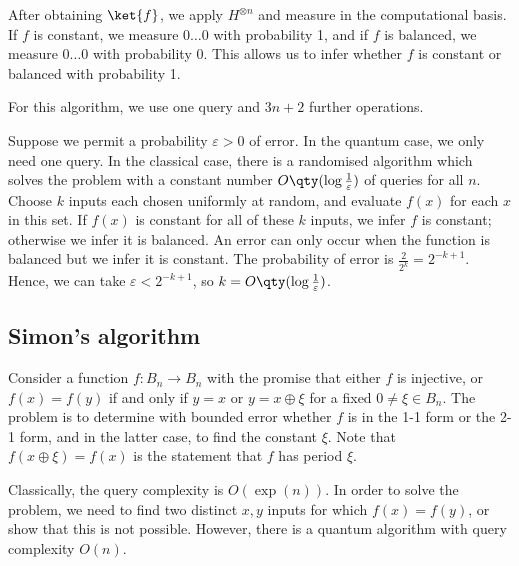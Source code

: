After obtaining $\ket{f}$, we apply $H^{\otimes n}$ and measure in the computational basis.
If $f$ is constant, we measure $0\dots 0$ with probability 1, and if $f$ is balanced, we measure $0\dots 0$ with probability 0.
This allows us to infer whether $f$ is constant or balanced with probability 1.
\begin{center}
    \leavevmode
\end{center}
For this algorithm, we use one query and $3n+2$ further operations.

Suppose we permit a probability $\varepsilon > 0$ of error.
In the quantum case, we only need one query.
In the classical case, there is a randomised algorithm which solves the problem with a constant number $O\qty(\log \frac{1}{\varepsilon})$ of queries for all $n$.
Choose $k$ inputs each chosen uniformly at random, and evaluate $f(x)$ for each $x$ in this set.
If $f(x)$ is constant for all of these $k$ inputs, we infer $f$ is constant; otherwise we infer it is balanced.
An error can only occur when the function is balanced but we infer it is constant.
The probability of error is $\frac{2}{2^k} = 2^{-k+1}$.
Hence, we can take $\varepsilon < 2^{-k+1}$, so $k = O\qty(\log \frac{1}{\varepsilon})$.

\subsection{Simon's algorithm}
Consider a function $f \colon B_n \to B_n$ with the promise that either $f$ is injective, or $f(x) = f(y)$ if and only if $y = x$ or $y = x \oplus \xi$ for a fixed $0 \neq \xi \in B_n$.
The problem is to determine with bounded error whether $f$ is in the 1-1 form or the 2-1 form, and in the latter case, to find the constant $\xi$.
Note that $f(x \oplus \xi) = f(x)$ is the statement that $f$ has period $\xi$.

Classically, the query complexity is $O(\exp(n))$.
In order to solve the problem, we need to find two distinct $x, y$ inputs for which $f(x) = f(y)$, or show that this is not possible.
However, there is a quantum algorithm with query complexity $O(n)$.

